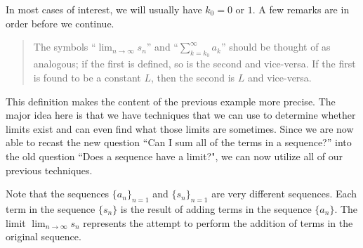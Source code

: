 \documentclass{ximera}
\begin{document}
In most cases of interest, we will usually have $k_0=0$ or $1$.  A few remarks are in order before we continue.

\begin{quote}
The symbols ``$\lim_{n \to \infty} s_n$'' and ``$\sum_{k=k_0}^{\infty} a_k$'' should be thought of as analogous; if the first is defined, so is the second and vice-versa.  If the first is found to be a constant $L$, then the second is $L$ and vice-versa.
\end{quote}

\begin{remark}
This definition makes the content of the previous example more precise.  The major idea here is that we have techniques that we can use to determine whether limits exist and can even find what those limits are sometimes.  Since we are now able to recast the new question ``Can I sum all of the terms in a sequence?'' into the old question ``Does a sequence have a limit?", we can now utilize all of our previous techniques.  
\end{remark}

\begin{warning}
Note that the sequences $\{a_n\}_{n=1}$ and $\{s_n\}_{n=1}$ are very different sequences.  Each term in the sequence $\{s_n\}$ is the result of adding terms in the sequence $\{a_n\}$.  The limit $\lim_{n \to \infty} s_n$ represents the attempt to perform the addition of terms in the original sequence.
\end{warning}

\end{document}
